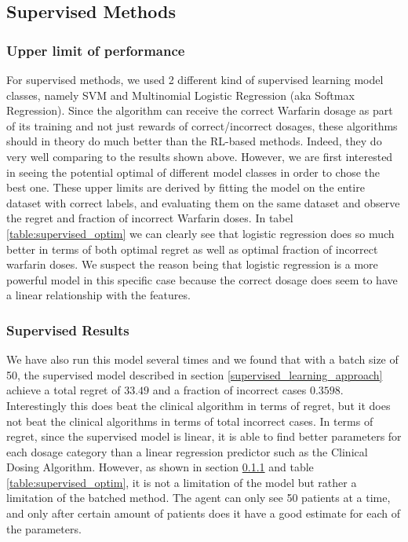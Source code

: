 \documentclass{article}
\begin{document}
\subsection{Supervised Methods}

\subsubsection{Upper limit of performance}
\label{supervised_upper_limit}
For supervised methods, we used 2 different kind of supervised learning model classes, namely SVM and Multinomial Logistic Regression (aka Softmax Regression). Since the algorithm can receive the correct Warfarin dosage as part of its training and not just rewards of correct/incorrect dosages, these algorithms should in theory do much better than the RL-based methods. Indeed, they do very well comparing to the results shown above.  However, we are first interested in seeing the potential optimal of different model classes in order to chose the best one. These upper limits are derived by fitting the model on the entire dataset with correct labels, and evaluating them on the same dataset and observe the regret and fraction of incorrect Warfarin doses. In tabel \ref{table:supervised_optim} we can clearly see that logistic regression does so much better in terms of both optimal regret as well as optimal fraction of incorrect warfarin doses. We suspect the reason being that logistic regression is a more powerful model in this specific case because the correct dosage does seem to have a linear relationship with the features.

\subsubsection{Supervised Results}
\label{supervised_results}
We have also run this model several times and we found that with a batch size of 50, the supervised model described in section \ref{supervised_learning_approach} achieve a total regret of $33.49$ and a fraction of incorrect cases $0.3598$. Interestingly this does beat the clinical algorithm in terms of regret, but it does not beat the clinical algorithms in terms of total incorrect cases. In terms of regret, since the supervised model is linear, it is able to find better parameters for each dosage category than a linear regression predictor such as the Clinical Dosing Algorithm. However, as shown in section \ref{supervised_upper_limit} and table \ref{table:supervised_optim}, it is not a limitation of the model but rather a limitation of the batched method. The agent can only see 50 patients at a time, and only after certain amount of patients does it have a good estimate for each of the parameters.
\end{document}
